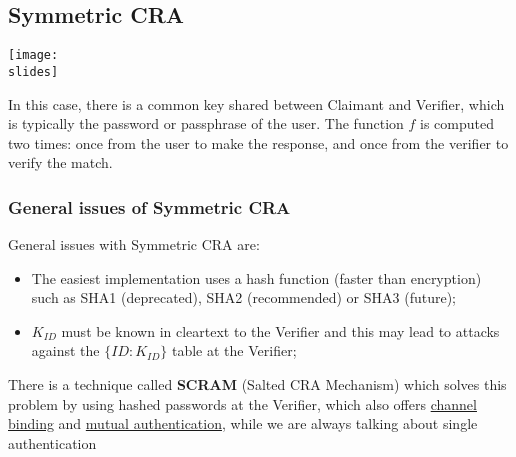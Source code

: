 \subsection{Symmetric CRA}

\noindent
\begin{minipage}{0.5\textwidth}
  \centering
  \texttt{[image: \\slides]}
\end{minipage}
\hspace{0.05\textwidth}
\begin{minipage}{0.4\textwidth}
  In this case, there is a common key
  shared between Claimant and Verifier,
  which is typically the password or
  passphrase of the user. The function \(f\) is computed two times: once from the user
  to make the response, and once from the
  verifier to verify the match.
\end{minipage}

\subsubsection{General issues of Symmetric CRA}
General issues with Symmetric CRA are:
\begin{itemize}
  \item The easiest implementation uses a hash function (faster than encryption) such as SHA1 (deprecated),
        SHA2 (recommended) or SHA3 (future);
  \item \(K_{ID}\) must be known in cleartext to the Verifier and this may lead to attacks against the \( \{ID: K_{ID}\} \) table at the Verifier;
\end{itemize}
There is a technique called \textbf{SCRAM} (Salted CRA Mechanism) which solves this problem by using hashed
passwords at the Verifier, which also offers \underline{channel binding} and \underline{mutual authentication}, while we are always talking about single authentication


